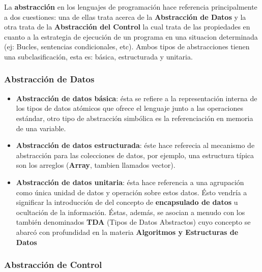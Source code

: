 \documentclass{article}
\begin{document}
La \textbf{abstracci\'on} en los lenguajes de programaci\'on hace referencia principalmente a dos cuestiones: una de ellas trata acerca de la \textbf{Abstracci\'on de Datos} y la otra trata de la \textbf{Abstracci\'on del Control} la cual trata de las propiedades en cuanto a la estrategia de ejecuci\'on de un programa en una situacion determinada (ej: Bucles, sentencias condicionales, etc). Ambos tipos de abstracciones tienen una subclasificaci\'on, esta es: b\'asica, estructurada y unitaria. 

\subsubsection{Abstracci\'on de Datos}
\begin{itemize}
  \item \textbf{Abstracci\'on de datos b\'asica}: \'esta se refiere a la representaci\'on interna de los tipos de datos at\'omicos que ofrece el lenguaje junto a las operaciones est\'andar, otro tipo de abstracci\'on simb\'olica es la referenciaci\'on en memoria de una variable.
  \item \textbf{Abstracci\'on de datos estructurada}: \'este hace referecia al mecanismo de abstracci\'on para las colecciones de datos, por ejemplo, una estructura t\'ipica son los arreglos (\textbf{Array}, tambien llamados vector).
  \item \textbf{Abstracci\'on de datos unitaria}: \'esta hace referencia a una agrupaci\'on como \'unica unidad de datos y operaci\'on sobre estos datos. \'Esto vendr\'ia a significar la introducci\'on de del concepto de \textbf{encapsulado de datos} u ocultaci\'on de la informaci\'on. \'Estas, adem\'as, se asocian a menudo con los tambi\'en denominados \textbf{TDA} (Tipos de Datos Abstractos) cuyo concepto se abarc\'o con profundidad en la materia \textbf{Algoritmos y Estructuras de Datos}
\end{itemize}

\subsubsection{Abstracci\'on de Control}
\end{document}
